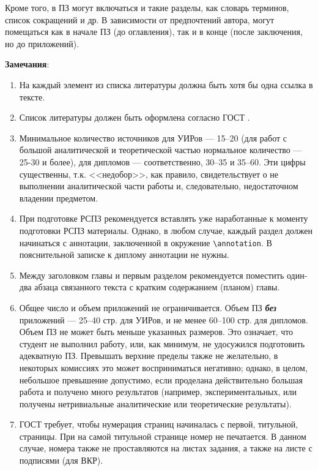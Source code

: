 Кроме того, в ПЗ могут включаться и такие разделы, как словарь терминов, 
список сокращений и др. В зависимости от предпочтений автора, могут 
помещаться как в начале ПЗ (до оглавления), так и в конце (после заключения, 
но до приложений).

\textbf{Замечания}:

\begin{enumerate}

  \item На каждый элемент из списка литературы должна быть хотя
бы одна ссылка в тексте.

  \item Список литературы должен быть оформлена согласно ГОСТ
\cite{Gost.7.0.53}.

  \item Минимальное количество источников для УИРов --- 15--20 (для
работ с большой аналитической и теоретической частью нормальное количество ---
25-30 и более), для дипломов --- соответственно, 30--35 и 35--60. Эти цифры
существенны, т.к. <<недобор>>, как правило, свидетельствует о не выполнении
аналитической части работы и, следовательно, недостаточном владении предметом.

  \item При подготовке РСПЗ рекомендуется вставлять уже наработанные к 
моменту подготовки РСПЗ материалы. Однако, в любом случае, каждый раздел 
должен начинаться с аннотации, заключенной в окружение \verb|\annotation|. В 
пояснительной записке к диплому аннотации не нужны. 

  \item Между заголовком главы и первым разделом рекомендуется поместить один-два абзаца связанного текста с кратким содержанием (планом) главы.

  \item Общее число и объем приложений не ограничивается. Объем ПЗ
\textbf{\textit{без}} приложений --- 25--40 стр. для УИРов, и не менее 60--100
стр. для дипломов. Объем ПЗ не может быть меньше указанных размеров. Это
означает, что студент не выполнил работу, или, как минимум, не удосужился
подготовить адекватную ПЗ. Превышать верхние пределы также не желательно, в
некоторых комиссиях это может восприниматься негативно; однако, в целом,
небольшое превышение допустимо, если проделана действительно большая работа и
получено много результатов (например, экспериментальных, или получены
нетривиальные аналитические или теоретические результаты).

  \item ГОСТ требует, чтобы нумерация страниц начиналась с 
первой, титульной, страницы. При на самой титульной странице номер не 
печатается. В данном случае, номера также не проставляются на листах задания, 
а также на листе с подписями (для ВКР).

\end{enumerate}

